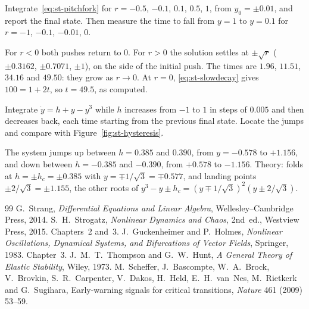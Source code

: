 \label{exo:st-computer-pitchfork}
%
Integrate~\eqref{eq:st-pitchfork} for $r = -0.5$, $-0.1$, $0.1$, $0.5$, $1$, from
$y_0 = \pm 0.01$, and report the final state. Then measure the time to fall from
$y = 1$ to $y = 0.1$ for $r = -1$, $-0.1$, $-0.01$, $0$.
\begin{solution}
For $r < 0$ both pushes return to $0$. For $r > 0$ the solution settles at
$\pm\sqrt r$ ($\pm 0.3162$, $\pm 0.7071$, $\pm 1$), on the side of the initial
push. The times are $1.96$, $11.51$, $34.16$ and $49.50$: they grow as $r \to 0$.
At $r = 0$, \eqref{eq:st-slowdecay} gives $100 = 1 + 2t$, so $t = 49.5$, as computed.

\end{solution}

\label{exo:st-computer-hysteresis}
%
Integrate $\dot y = h + y - y^3$ while $h$ increases from $-1$ to $1$ in steps of
$0.005$ and then decreases back, each time starting from the previous final state.
Locate the jumps and compare with Figure~\ref{fig:st-hysteresis}.
\begin{solution}
The system jumps up between $h = 0.385$ and $0.390$, from $y = -0.578$ to
$+1.156$, and down between $h = -0.385$ and $-0.390$, from $+0.578$ to $-1.156$.
Theory: folds at $h = \pm h_c = \pm 0.385$ with $y = \mp 1/\sqrt3 = \mp 0.577$, and
landing points $\pm 2/\sqrt3 = \pm 1.155$, the other roots of
$y^3 - y \pm h_c = (y \mp 1/\sqrt3)^2(y \pm 2/\sqrt3)$.

\end{solution}

\begin{chapterbib}{99}
 G.~Strang, \emph{Differential Equations and Linear
  Algebra}, Wellesley--Cambridge Press, 2014.
 S.~H.~Strogatz, \emph{Nonlinear Dynamics and Chaos},
  2nd~ed., Westview Press, 2015. Chapters~2 and~3.
 J.~Guckenheimer and P.~Holmes, \emph{Nonlinear
  Oscillations, Dynamical Systems, and Bifurcations of Vector Fields}, Springer,
  1983. Chapter~3.
 J.~M.~T.~Thompson and G.~W.~Hunt, \emph{A General
  Theory of Elastic Stability}, Wiley, 1973.
 M.~Scheffer, J.~Bascompte, W.~A.~Brock, V.~Brovkin,
  S.~R.~Carpenter, V.~Dakos, H.~Held, E.~H.~van~Nes, M.~Rietkerk and G.~Sugihara,
  Early-warning signals for critical transitions, \emph{Nature} 461 (2009) 53--59.
\end{chapterbib}
